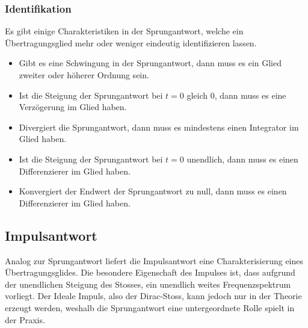 \subsubsection{Identifikation}
Es gibt einige Charakteristiken in der Sprungantwort, welche ein
Übertragungsglied mehr oder weniger eindeutig identifizieren lassen.

\begin{itemize}
    \item Gibt es eine Schwingung in der Sprungantwort, dann muss es 
        ein Glied zweiter oder höherer Ordnung sein.
    \item Ist die Steigung der Sprungantwort bei $t=0$ gleich $0$, dann
        muss es eine Verzögerung im Glied haben.
    \item Divergiert die Sprungantwort, dann muss es mindestens einen
        Integrator im Glied haben. 
    \item Ist die Steigung der Sprungantwort bei $t=0$ unendlich, dann
        muss es einen Differenzierer im Glied haben.
    \item Konvergiert der Endwert der Sprungantwort zu null, dann muss
        es einen Differenzierer im Glied haben.
\end{itemize}

\subsection{Impulsantwort}
Analog zur Sprungantwort liefert die Impulsantwort eine Charakterisierung
eines Übertragungsglides. Die besondere Eigenschaft des Impulses ist,
dass aufgrund der unendlichen Steigung des Stosses, ein unendlich weites
Frequenzspektrum vorliegt. Der Ideale Impuls, also der Dirac-Stoss, kann
jedoch nur in der Theorie erzeugt werden, weshalb die Sprungantwort
eine untergeordnete Rolle spielt in der Praxis.
%
\begin{figure}[h!]
    \centering
\end{figure}

